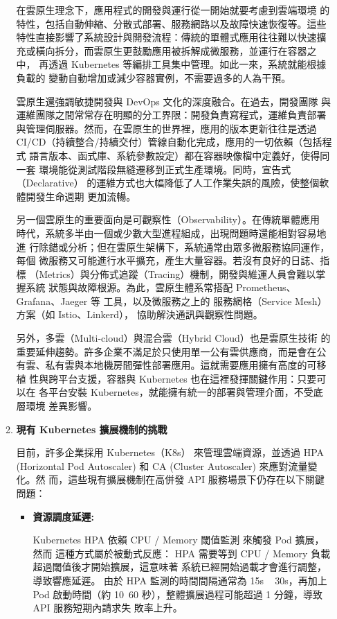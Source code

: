 \documentclass[12pt,a4paper]{article}
\begin{document}
\begin{enumerate}[label={(\zhdig*)}, leftmargin=2\parindent, listparindent=\parindent]
\begin{enumerate}[label={(\arabic*)}, leftmargin=\parindent, listparindent=\parindent]
在雲原生理念下，應用程式的開發與運行從一開始就要考慮到雲端環境
的特性，包括自動伸縮、分散式部署、服務網路以及故障快速恢復等。這些
特性直接影響了系統設計與開發流程：傳統的單體式應用往往難以快速擴
充或橫向拆分，而雲原生更鼓勵應用被拆解成微服務，並運行在容器之中，
再透過 Kubernetes 等編排工具集中管理。如此一來，系統就能根據負載的
變動自動增加或減少容器實例，不需要過多的人為干預。

雲原生還強調敏捷開發與 DevOps 文化的深度融合。在過去，開發團隊
與運維團隊之間常常存在明顯的分工界限：開發負責寫程式，運維負責部署
與管理伺服器。然而，在雲原生的世界裡，應用的版本更新往往是透過
CI/CD（持續整合/持續交付）管線自動化完成，應用的一切依賴（包括程式
語言版本、函式庫、系統參數設定）都在容器映像檔中定義好，使得同一套
環境能從測試階段無縫遷移到正式生產環境。同時，宣告式（Declarative）
的運維方式也大幅降低了人工作業失誤的風險，使整個軟體開發生命週期
更加流暢。

另一個雲原生的重要面向是可觀察性（Observability）。在傳統單體應用
時代，系統多半由一個或少數大型進程組成，出現問題時還能相對容易地進
行除錯或分析；但在雲原生架構下，系統通常由眾多微服務協同運作，每個
微服務又可能進行水平擴充，產生大量容器。若沒有良好的日誌、指標
（Metrics）與分佈式追蹤（Tracing）機制，開發與維運人員會難以掌握系統
狀態與故障根源。為此，雲原生體系常搭配 Prometheus、Grafana、Jaeger 等
工具，以及微服務之上的 服務網格（Service Mesh）方案（如 Istio、Linkerd），
協助解決通訊與觀察性問題。

另外，多雲（Multi-cloud）與混合雲（Hybrid Cloud）也是雲原生技術
的重要延伸趨勢。許多企業不滿足於只使用單一公有雲供應商，而是會在公
有雲、私有雲與本地機房間彈性部署應用。這就需要應用擁有高度的可移植
性與跨平台支援，容器與 Kubernetes 也在這裡發揮關鍵作用：只要可以在
各平台安裝 Kubernetes，就能擁有統一的部署與管理介面，不受底層環境
差異影響。

\item\textbf{現有 Kubernetes 擴展機制的挑戰}

目前，許多企業採用 Kubernetes（K8s） 來管理雲端資源，並透過 HPA
(Horizontal Pod Autoscaler) 和 CA (Cluster Autoscaler) 來應對流量變化。然
而，這些現有擴展機制在高併發 API 服務場景下仍存在以下關鍵問題：
\begin{itemize}[leftmargin=\parindent, listparindent=\parindent]
    \item\textbf{資源調度延遲:}

Kubernetes HPA 依賴 CPU / Memory 閾值監測 來觸發 Pod 擴展，然而
這種方式屬於被動式反應：
HPA 需要等到 CPU / Memory 負載超過閾值後才開始擴展，這意味著
系統已經開始過載才會進行調整，導致響應延遲。
由於 HPA 監測的時間間隔通常為 15s ~ 30s，再加上 Pod 啟動時間（約
10~60 秒），整體擴展過程可能超過 1 分鐘，導致 API 服務短期內請求失
敗率上升。


\end{itemize}
\end{enumerate}
\end{enumerate}
\end{document}
